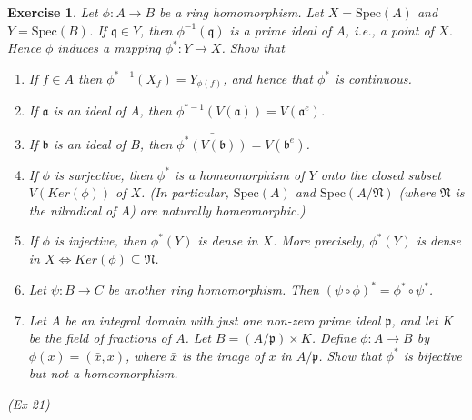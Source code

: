 \documentclass[]{report}
\newtheorem{exercise}[theorem]{Exercise}
\begin{document}
\begin{exercise}
    Let $\phi: A\rightarrow B$ be a ring homomorphism. Let $X = \text{Spec}(A)$ and $Y = \text{Spec}(B)$. If $\mathfrak{q}\in Y$, then $\phi^{-1}(\mathfrak{q})$ is a prime ideal of $A$, i.e., a point of $X$. Hence $\phi$ induces a mapping $\phi^*: Y\rightarrow X$. Show that
    \begin{enumerate}
        \item If $f\in A$ then $\phi^{*-1}(X_f) = Y_{\phi(f)}$, and hence that $\phi^*$ is continuous.
        \item If $\mathfrak{a}$ is an ideal of $A$, then $\phi^{*-1}(V(\mathfrak{a})) = V(\mathfrak{a}^e)$. 
        \item If $\mathfrak{b}$ is an ideal of $B$, then $\bar{\phi^*(V(\mathfrak{b}))} = V(\mathfrak{b}^e)$. 
        \item If $\phi$ is surjective, then $\phi^*$ is a homeomorphism of $Y$ onto the closed subset $V(Ker(\phi))$ of $X$. (In particular, $\text{Spec}(A)$ and $\text{Spec}(A/\mathfrak{N})$ (where $\mathfrak{N}$ is the nilradical of $A$) are naturally homeomorphic.)
        \item If $\phi$ is injective, then $\phi^*(Y)$ is dense in $X$. More precisely, $\phi^*(Y)$ is dense in $X\Leftrightarrow Ker(\phi) \subseteq \mathfrak{N}$.
        \item Let $\psi: B\rightarrow C$ be another ring homomorphism. Then $(\psi \circ \phi)^* = \phi^* \circ \psi^*$. 
        \item Let $A$ be an integral domain with just one non-zero prime ideal $\mathfrak{p}$, and let $K$ be the field of fractions of $A$. Let $B = (A/\mathfrak{p}) \times K$. Define $\phi: A\rightarrow B$ by $\phi(x) = (\bar{x}, x)$, where $\bar{x}$ is the image of $x$ in $A/\mathfrak{p}$. Show that $\phi^*$ is bijective but not a homeomorphism.
    \end{enumerate}
    (Ex 21)
\end{exercise}
\end{document}

